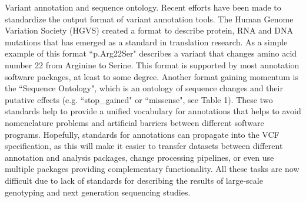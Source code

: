 \begin{framed}
{Variant annotation and sequence ontology. Recent efforts have been made to standardize the output format of variant annotation tools. The Human Genome Variation Society (HGVS) created a format to describe protein, RNA and DNA mutations that has emerged as a standard in translation research. As a simple example of this format ``p.Arg22Ser" describes a variant that changes amino acid number 22 from Arginine to Serine. This format is supported by most annotation software packages, at least to some degree. Another format gaining momentum is the ``Sequence Ontology", which is an ontology of sequence changes and their putative effects (e.g. ``stop\_gained" or ``missense", see Table 1). These two standards help to provide a unified vocabulary for annotations that helps to avoid nomenclature problems and artificial barriers between different software programs. Hopefully, standards for annotations can propagate into the VCF specification, as this will make it easier to transfer datasets between different annotation and analysis packages, change processing pipelines, or even use multiple packages providing complementary functionality. All these tasks are now difficult due to lack of standards for describing the results of large-scale genotyping and next generation sequencing studies. 
}
\end{framed}

